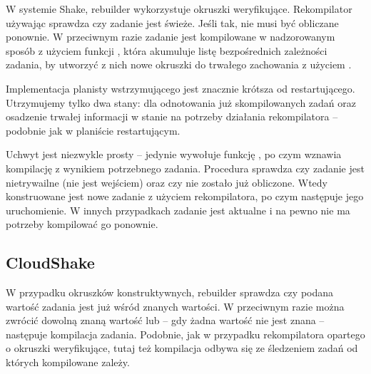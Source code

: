 

W systemie Shake, rebuilder wykorzystuje okruszki weryfikujące. Rekompilator używając  sprawdza czy zadanie jest świeże. Jeśli tak, nie musi być obliczane ponownie. W przeciwnym razie zadanie jest kompilowane w nadzorowanym sposób z użyciem funkcji , która akumuluje listę bezpośrednich zależności zadania, by utworzyć z nich nowe okruszki do trwałego zachowania z użyciem .



Implementacja planisty wstrzymującego jest znacznie krótsza od restartującego. Utrzymujemy tylko dwa stany:  dla odnotowania już skompilowanych zadań oraz osadzenie trwałej informacji w stanie na potrzeby działania rekompilatora -- podobnie jak w planiście restartującym.



Uchwyt  jest niezwykle prosty -- jedynie wywołuje funkcję , po czym wznawia kompilację z wynikiem potrzebnego zadania. Procedura  sprawdza czy zadanie jest nietrywailne (nie jest wejściem) oraz czy nie zostało już obliczone. Wtedy konstruowane jest nowe zadanie z użyciem rekompilatora, po czym następuje jego uruchomienie. W innych przypadkach zadanie jest aktualne i na pewno nie ma potrzeby kompilować go ponownie.

\subsection{CloudShake}





W przypadku okruszków konstruktywnych, rebuilder sprawdza czy podana wartość zadania jest już wśród znanych wartości. W przeciwnym razie można zwrócić dowolną znaną wartość lub -- gdy żadna wartość nie jest znana -- następuje kompilacja zadania. Podobnie, jak w przypadku rekompilatora opartego o okruszki weryfikujące, tutaj też kompilacja odbywa się ze śledzeniem zadań od których kompilowane zależy.


